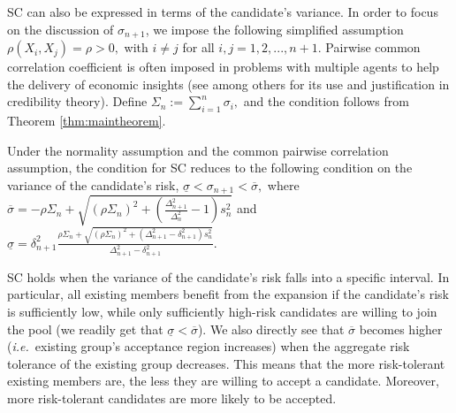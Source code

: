 \documentclass[fleqn,mnsc,nonblindrev]{informs4}
\begin{document}
SC can also be expressed in terms of the candidate's variance. In order to focus on the discussion of $\sigma_{n+1}$, we impose the following 
simplified assumption  {$\rho(X_i,X_j)=\rho>0,$ with $i\neq j$ for all $i,j=1,2,...,n+1.$} Pairwise common correlation coefficient is often imposed in problems with multiple agents to help the delivery of economic insights (see among others \cite[Chapter 18]{kpw} for its use and justification in credibility theory).
Define $\Sigma_{n}:=\sum_{i=1}^n\sigma_{i},$ and the condition follows from Theorem \ref{thm:maintheorem}.
\begin{corollary}\label{cor:acceptance}
Under the normality assumption and the common pairwise correlation assumption,   {the condition for SC} reduces to the following condition on the variance of the candidate's risk, $\underline{\sigma} <\sigma_{n+1}< \overline{\sigma},$ where $\overline{\sigma} =-\rho\Sigma_{n}+\sqrt{\left(\rho\Sigma_{n}\right)^2+\left(\frac{\Delta_{n+1}^2}{\Delta_{n}^2}-1\right)s_{n}^2}$ and $\underline{\sigma} =\delta_{n+1}^2\frac{\rho\Sigma_{n}+\sqrt{\left(\rho\Sigma_{n}\right)^2+(\Delta_{n+1}^2-\delta_{n+1}^2)s_{n}^2}}{\Delta_{n+1}^2-\delta_{n+1}^2}.$
\end{corollary}
SC holds when the variance of the candidate's risk falls into a specific interval. In particular, all existing members benefit from the expansion if the candidate's risk is sufficiently low, while only sufficiently high-risk candidates are willing to join the pool (we readily get that $\underline{\sigma}<\overline{\sigma}$). We also directly see that $ \overline{\sigma}$ becomes higher ({\it i.e.}~existing group's acceptance region increases) when the aggregate risk tolerance of the existing group decreases. This means that the more risk-tolerant existing members are, the less they are willing to accept a candidate. Moreover, more risk-tolerant candidates are more likely to be accepted.



\end{document}
